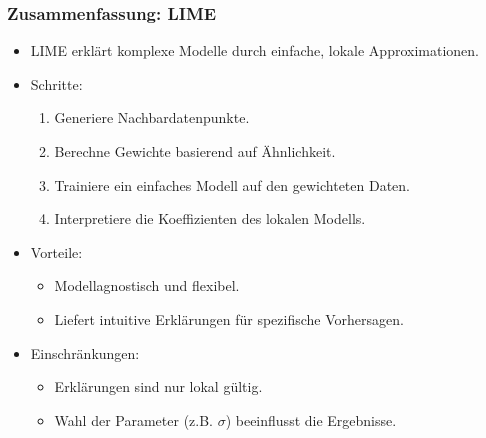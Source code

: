 \documentclass[aspectratio=1610, xcolor=dvipsnames, 9pt]{beamer}
\begin{document}
\begin{frame}
  \frametitle{Zusammenfassung: LIME}
  \begin{itemize}
    \item LIME erklärt komplexe Modelle durch einfache, lokale Approximationen.
    \item Schritte:
    \begin{enumerate}
      \item Generiere Nachbardatenpunkte.
      \item Berechne Gewichte basierend auf Ähnlichkeit.
      \item Trainiere ein einfaches Modell auf den gewichteten Daten.
      \item Interpretiere die Koeffizienten des lokalen Modells.
    \end{enumerate}
    \item Vorteile:
    \begin{itemize}
      \item Modellagnostisch und flexibel.
      \item Liefert intuitive Erklärungen für spezifische Vorhersagen.
    \end{itemize}
    \item Einschränkungen:
    \begin{itemize}
      \item Erklärungen sind nur lokal gültig.
      \item Wahl der Parameter (z.B. $\sigma$) beeinflusst die Ergebnisse.
    \end{itemize}
  \end{itemize}
\end{frame}
\end{document}
